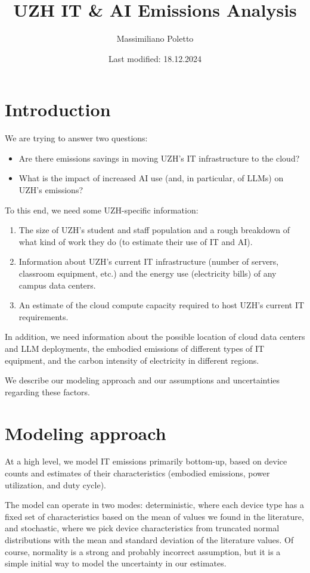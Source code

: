 \documentclass[11pt]{article}
\title{UZH IT \& AI Emissions Analysis\vspace{-1em}}
\author{Massimiliano Poletto}
\date{\vspace{-1em}Last modified: 18.12.2024}
\begin{document}
\maketitle
\section{Introduction}

We are trying to answer two questions:
\begin{itemize}
    \item Are there emissions savings in moving UZH's IT infrastructure to the cloud?
    \item What is the impact of increased AI use (and, in particular, of LLMs) on UZH's emissions?
\end{itemize}

To this end, we need some UZH-specific information:
\begin{enumerate}
    \item The size of UZH's student and staff population and a rough breakdown of
        what kind of work they do (to estimate their use of IT and AI).
    \item Information about UZH's current IT infrastructure (number of servers,
        classroom equipment, etc.) and the energy use (electricity bills) of any
        campus data centers.
    \item An estimate of the cloud compute capacity required to host UZH's current IT requirements.
\end{enumerate}

In addition, we need information about the possible location of cloud data centers and
LLM deployments, the embodied emissions of different types of IT equipment, and the carbon intensity
of electricity in different regions.

We describe our modeling approach and our assumptions and uncertainties regarding these factors.

\section{Modeling approach}

At a high level, we model IT emissions primarily bottom-up, based on device counts and
estimates of their characteristics (embodied emissions, power utilization, and duty cycle).

The model can operate in two modes: deterministic, where each device type has a fixed set of
characteristics based on the mean of values we found in the literature, and stochastic, where
we pick device characteristics from truncated normal distributions with the mean and standard
deviation of the literature values. Of course, normality is a strong and probably incorrect
assumption, but it is a simple initial way to model the uncertainty in our estimates.
\end{document}
